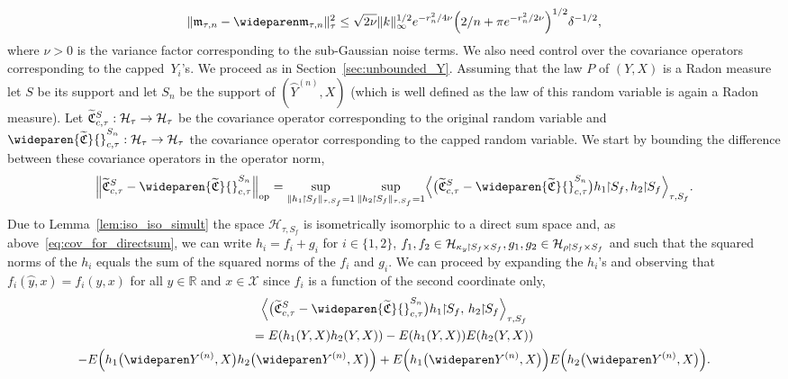\documentclass[10pt]{amsart}
\theoremstyle{definition}\newtheorem{defi}[theo]{Definition}\newtheorem{rema}[theo]{Remark}\newtheorem{exam}[theo]{Example}\newtheorem{exem}[theo]{Example}\newtheorem{nota}[theo]{Notation}
\theoremstyle{remark}
\DeclareMathOperator{\opp}{op}
\newcommand{\restrr}
{\!\!\upharpoonright\!\!}
\newcommand{\R}{\mathbb{R}}
\newcommand{\X}{\mathcal{X}}
\newcommand{\cH}{\mathcal{H}}
\newcommand{\fkC}{\mathfrak{C}}
\newcommand{\Cov}{\tilde{\fkC}}
\newcommand{\mean}{\mathfrak{m}}
\newcommand{\CovCapntau}{\wideparen{\widetilde{\fkC}}{\vphantom{\fkC}}^{S_n}_{c,\tau}}
\newcommand*{\mk}{\mkern -1mu}
\let\oldtilde\tilde
\renewcommand*{\tilde}[1]{\mathchoice{\widetilde{#1}}{\widetilde{#1}}{\oldtilde{#1}}{\oldtilde{#1}}}
\renewcommand*{\to}{\mathchoice{\longrightarrow}{\rightarrow}{\rightarrow}{\rightarrow}}
\let\originalleft\left
\let\originalright\right
\renewcommand{\left}{\mathopen{}\mathclose\bgroup\originalleft}
\renewcommand{\right}{\aftergroup\egroup\originalright}
\begin{document}
\begin{equation}
\| \mean_{\tau,n} - \wideparen \mean_{\tau,n} \|^2_\tau \leq \sqrt{2 \nu} \|k\|^{1/2}_\infty e^{-r_n^2/4 \nu} \Bigl(2/n + \pi e^{-r_n^2/2 \nu} \Bigr)^{1/2}
\delta^{-1/2}, \label{eq:direct_sum_mean}
\end{equation}
where $\nu>0$ is the variance factor corresponding to the sub-Gaussian noise terms. We also need control over the covariance operators corresponding to the capped~$Y_i$'s. We proceed as in Section~\ref{sec:unbounded_Y}. Assuming that the law $P$ of $(Y,X)$ is a Radon measure let $S$ be its support and let $S_n$ be the support of $(\wideparen Y^{(n)}, X)$ (which is well defined as the law of this random variable is again a Radon measure). Let $\Cov_{c,\tau}^S : \cH_\tau \to \cH_\tau$ be the covariance operator corresponding to the original random variable and $\CovCapntau: \cH_\tau \to \cH_\tau$ the covariance operator corresponding to the capped random variable. We start by bounding the difference between these covariance operators in the operator norm,
\begin{align*}
\left\|\Cov_{c,\tau}^S - \CovCapntau\right\|_{\opp} = \sup_{\|h_1 \mk\upharpoonright\mk S_f\|_{\tau,S_f} =1} \sup_{\|h_2 \mk\upharpoonright\mk S_f\|_{\tau,S_f} =1}
\left\langle \bigl(\Cov_{c,\tau}^S - \CovCapntau\bigr) h_1 \restrr S_f, h_2 \restrr S_f\right\rangle_{\tau,S_f}.
\end{align*}
Due to Lemma~\ref{lem:iso_iso_simult} the space $\cH_{\tau,S_f}$ is isometrically isomorphic to a direct sum space and, as above~\eqref{eq:cov_for_directsum}, we can write $h_i = f_i + g_i$ for $i \in \{1,2\}$, $f_1,f_2 \in \cH_{\kappa_y\mk\upharpoonright\mk S_f \times S_f}, g_1,g_2 \in \cH_{\rho \mk\upharpoonright\mk S_f \times S_f}$ and such that the squared norms of the $h_i$ equals the sum of the squared norms of the $f_i$ and $g_i$. We can proceed by expanding the $h_i$'s and observing that $f_i(\wideparen y,x) = f_i(y,x)$ for all $y \in \R$ and $x\in \X$ since $f_i$ is a function of the second coordinate only,
\begin{multline*}
\left\langle \bigl(\Cov_{c,\tau}^S - \CovCapntau\bigr) h_1 \restrr S_f,\, h_2 \restrr S_f\right\rangle_{\tau,S_f} \\
= E(h_1(Y,X) h_2(Y,X)) - E(h_1(Y,X)) E(h_2(Y,X)) \\  - E\left(h_1\bigl(\wideparen Y^{(n)},X\bigr) h_2\bigl(\wideparen Y^{(n)},X\bigr)\right) + E\left(h_1\bigl(\wideparen Y^{(n)},X\bigr)\right) E\left(h_2\bigl(\wideparen Y^{(n)},X\bigr)\right).
\end{multline*}
\end{document}
